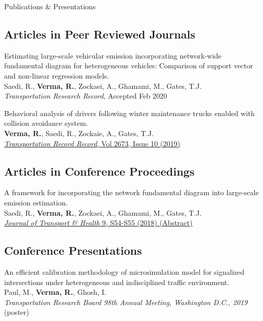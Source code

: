 \documentclass{resume} %
\begin{document}
\begin{rSection}{Publications \& Presentations}
    \subsection*{Articles in Peer Reviewed Journals}
    \begin{etaremune}
        \item Estimating large-scale vehicular emission incorporating network-wide fundamental diagram for heterogeneous vehicles: Comparison of support vector and non-linear regression models.
        \\ Saedi, R., \textbf{Verma, R.}, Zockaei, A., Ghamami, M., Gates, T.J.
        \\ \textit{Transportation Research Record}, Accepted Feb 2020
        
        \item Behavioral analysis of drivers following winter maintenance trucks enabled with collision avoidance system.
        \\ \textbf{Verma, R.}, Saedi, R., Zockaie, A., Gates, T.J.
        \\ \href{https://journals.sagepub.com/doi/abs/10.1177/0361198119850131}{\textit{Transportation Record Record}, Vol 2673, Issue 10 (2019)}
    \end{etaremune}
    
    \subsection*{Articles in Conference Proceedings}
    \begin{etaremune}
        \item A framework for incorporating the network fundamental diagram into large-scale emission estimation.
        \\ Saedi, R., \textbf{Verma, R.}, Zockaei, A., Ghamami, M., Gates, T.J.
        \\ \href{https://www.sciencedirect.com/science/article/pii/S2214140518302263}{\textit{Journal of Transport \& Health} 9, S54-S55 (2018) (Abstract)}
    \end{etaremune}
    
    \subsection*{Conference Presentations}
    \begin{etaremune}
        \item An efficient calibration methodology of microsimulation model for signalized intersections under heterogeneous and indisciplined traffic environment.
        \\ Paul, M., \textbf{Verma, R.}, Ghosh, I.
        \\ \textit{Transportation Research Board 98th Annual Meeting, Washington D.C., 2019} (poster)
        

\end{etaremune}
\end{rSection}
\end{document}
